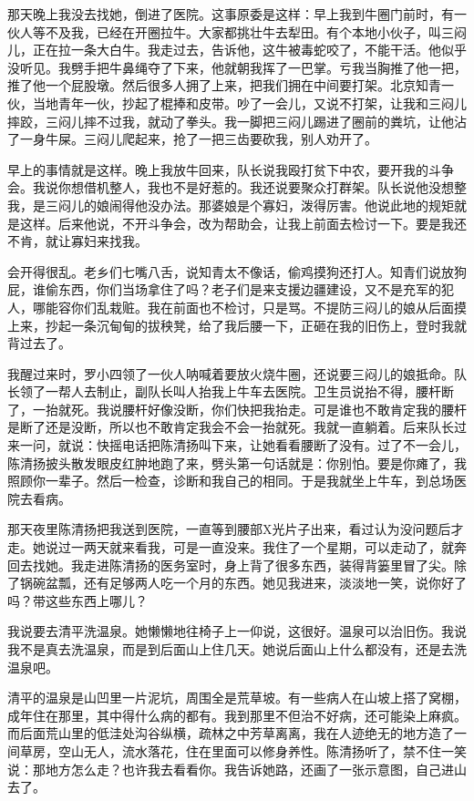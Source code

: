  那天晚上我没去找她，倒进了医院。这事原委是这样：早上我到牛圈门前时，有一伙人等不及我，已经在开圈拉牛。大家都挑壮牛去犁田。有个本地小伙子，叫三闷儿，正在拉一条大白牛。我走过去，告诉他，这牛被毒蛇咬了，不能干活。他似乎没听见。我劈手把牛鼻绳夺了下来，他就朝我挥了一巴掌。亏我当胸推了他一把，推了他一个屁股墩。然后很多人拥了上来，把我们拥在中间要打架。北京知青一伙，当地青年一伙，抄起了棍捧和皮带。吵了一会儿，又说不打架，让我和三闷儿摔跤，三闷儿摔不过我，就动了拳头。我一脚把三闷儿踢进了圈前的粪坑，让他沾了一身牛屎。三闷儿爬起来，抢了一把三齿要砍我，别人劝开了。 
 
 早上的事情就是这样。晚上我放牛回来，队长说我殴打贫下中农，要开我的斗争会。我说你想借机整人，我也不是好惹的。我还说要聚众打群架。队长说他没想整我，是三闷儿的娘闹得他没办法。那婆娘是个寡妇，泼得厉害。他说此地的规矩就是这样。后来他说，不开斗争会，改为帮助会，让我上前面去检讨一下。要是我还不肯，就让寡妇来找我。 
 
 会开得很乱。老乡们七嘴八舌，说知青太不像话，偷鸡摸狗还打人。知青们说放狗屁，谁偷东西，你们当场拿住了吗？老子们是来支援边疆建设，又不是充军的犯人，哪能容你们乱栽赃。我在前面也不检讨，只是骂。不提防三闷儿的娘从后面摸上来，抄起一条沉甸甸的拔秧凳，给了我后腰一下，正砸在我的旧伤上，登时我就背过去了。 
 
 我醒过来时，罗小四领了一伙人呐喊着要放火烧牛圈，还说要三闷儿的娘抵命。队长领了一帮人去制止，副队长叫人抬我上牛车去医院。卫生员说抬不得，腰杆断了，一抬就死。我说腰杆好像没断，你们快把我抬走。可是谁也不敢肯定我的腰杆是断了还是没断，所以也不敢肯定我会不会一抬就死。我就一直躺着。后来队长过来一问，就说：快摇电话把陈清扬叫下来，让她看看腰断了没有。过了不一会儿，陈清扬披头散发眼皮红肿地跑了来，劈头第一句话就是：你别怕。要是你瘫了，我照顾你一辈子。然后一检查，诊断和我自己的相同。于是我就坐上牛车，到总场医院去看病。 
 
 那天夜里陈清扬把我送到医院，一直等到腰部X光片子出来，看过认为没问题后才走。她说过一两天就来看我，可是一直没来。我住了一个星期，可以走动了，就奔回去找她。我走进陈清扬的医务室时，身上背了很多东西，装得背篓里冒了尖。除了锅碗盆瓢，还有足够两人吃一个月的东西。她见我进来，淡淡地一笑，说你好了吗？带这些东西上哪儿？ 
 
 我说要去清平洗温泉。她懒懒地往椅子上一仰说，这很好。温泉可以治旧伤。我说我不是真去洗温泉，而是到后面山上住几天。她说后面山上什么都没有，还是去洗温泉吧。 
 
 清平的温泉是山凹里一片泥坑，周围全是荒草坡。有一些病人在山坡上搭了窝棚，成年住在那里，其中得什么病的都有。我到那里不但治不好病，还可能染上麻疯。而后面荒山里的低洼处沟谷纵横，疏林之中芳草离离，我在人迹绝无的地方造了一间草房，空山无人，流水落花，住在里面可以修身养性。陈清扬听了，禁不住一笑说：那地方怎么走？也许我去看看你。我告诉她路，还画了一张示意图，自己进山去了。 
 
